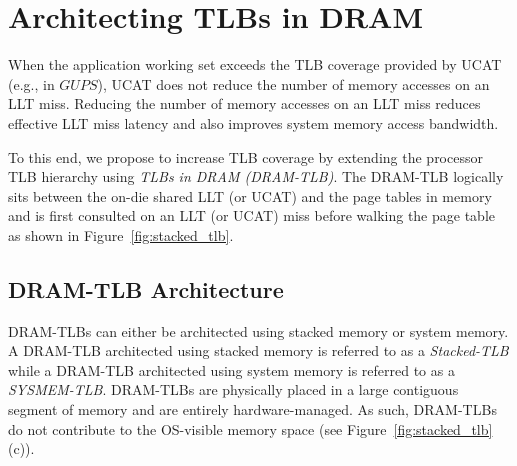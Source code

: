 \section{Architecting TLBs in DRAM } 
\label{sec:stackedTLB}

\noindent When the application working set exceeds the TLB coverage
provided by UCAT (e.g., in $GUPS$), UCAT does not reduce the number of
memory accesses on an LLT miss. Reducing the number of memory accesses
on an LLT miss reduces effective LLT miss latency and also improves 
system memory access bandwidth.

To this end, we propose to increase TLB coverage by
extending the processor TLB hierarchy using {\em TLBs in DRAM
(DRAM-TLB)}. The DRAM-TLB logically sits between the on-die shared LLT
(or UCAT) and the page tables in memory and is first consulted on an
LLT (or UCAT) miss before walking the page table as shown in
Figure~\ref{fig:stacked_tlb}.


\begin{figure*}[t] 
  \vspace{-0. in} \centering
   \centerline{}

  \caption{\small Improving TLB coverage by embedding TLBs in DRAM
    (DRAM-TLB). A DRAM-TLB architected using commodity DRAM is called
    SYSMEM-TLB and a DRAM-TLB architected with stacked DRAM is called
    Stacked-TLB. \normalsize}
  \label{fig:stacked_tlb} 
  \vspace{-0. in}
\end{figure*}

\subsection{DRAM-TLB Architecture}

\noindent DRAM-TLBs can either be architected using stacked memory or
system memory. A DRAM-TLB architected using stacked memory is referred
to as a {\em Stacked-TLB} while a DRAM-TLB architected using system
memory is referred to as a {\em SYSMEM-TLB}. DRAM-TLBs are physically
placed in a large contiguous segment of memory and are entirely
hardware-managed. As such, DRAM-TLBs do not contribute to the
OS-visible memory space (see Figure~\ref{fig:stacked_tlb}(c)).

